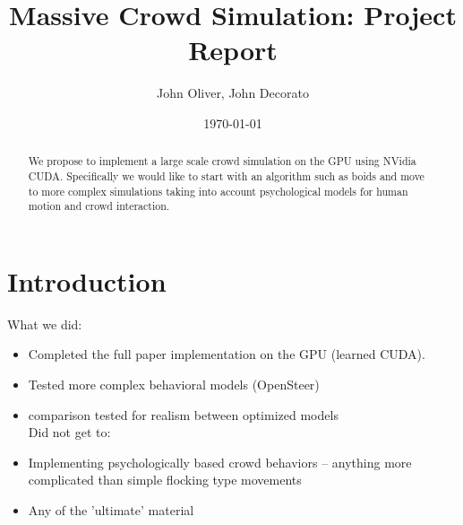 \documentclass[cameraready]{acmsiggraph}  %
\title{\sf Massive Crowd Simulation: Project Report}
\date{\today}
\author{John Oliver, John Decorato}
\affiliation{Cornell University}
\begin{document}
\maketitle

\begin{abstract}

We propose to implement a large scale crowd simulation on the GPU using NVidia CUDA.  Specifically we would like to start with an algorithm such as boids and move to more complex simulations taking into account psychological models for human motion and crowd interaction.

\end{abstract}

\section{Introduction}

What we did:\\

\begin{itemize}
\item Completed the full paper implementation on the GPU (learned CUDA).
\item Tested more complex behavioral models (OpenSteer)
\item comparison tested for realism between optimized models\\

Did not get to:
\item Implementing psychologically based crowd behaviors -- anything more complicated than simple flocking type movements
\item Any of the 'ultimate' material
\end{itemize}
\end{document}
